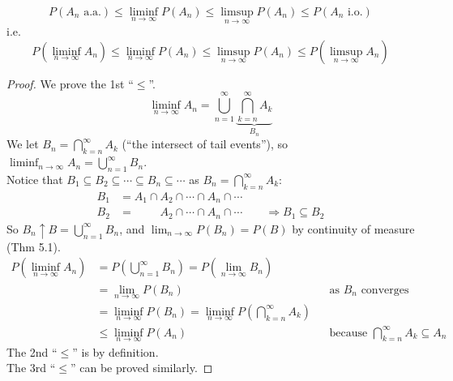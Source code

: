 \begin{reqproof}
\begin{proposition}[][5.2.2]
    \[P(A_n \text{ a.a.}) \leq \liminf_{n\to\infty} P(A_n) \leq \limsup_{n\to\infty} P(A_n) \leq P(A_n \text{ i.o.})\]
    i.e.
    \[P\left(\liminf_{n\to\infty} A_n\right) \leq \liminf_{n\to\infty} P(A_n) \leq \limsup_{n\to\infty} P(A_n) \leq P\left(\limsup_{n\to\infty} A_n\right)\]
    \begin{proof}
        We prove the 1st ``$\leq$''.
        \[\liminf_{n\to\infty} A_n = \bigcup_{n=1}^\infty \underbrace{\bigcap_{k=n}^\infty A_k}_{B_n}\]
        We let $B_n = \bigcap_{k=n}^\infty A_k$ (``the intersect of tail events''), so $\liminf_{n\to\infty} A_n = \bigcup_{n=1}^\infty B_n$.
        \\Notice that $B_1 \subseteq B_2 \subseteq \cdots \subseteq B_n \subseteq \cdots$ as $B_n = \bigcap_{k=n}^\infty A_k$:
        \begin{align*}
            B_1 &= A_1 \cap A_2 \cap \cdots \cap A_n \cap \cdots\\
            B_2 &= \phantom{A_1 \cap{}} A_2 \cap \cdots \cap A_n \cap \cdots \qquad \Rightarrow B_1 \subseteq B_2
        \end{align*}
        So $B_n \uparrow B = \bigcup_{n=1}^\infty B_n$, and $\lim_{n\to\infty} P(B_n) = P(B)$ by continuity of measure (Thm 5.1).
        \begin{align*}
            P\left(\liminf_{n\to\infty} A_n\right) &= P\left(\bigcup_{n=1}^\infty B_n\right) = P\left(\lim_{n\to\infty} B_n\right)\\
            &= \lim_{n\to\infty} P(B_n) & &\text{as $B_n$ converges}\\
            &= \liminf_{n\to\infty} P(B_n) = \liminf_{n\to\infty} P\left(\bigcap_{k=n}^\infty A_k\right)\\
            &\leq \liminf_{n\to\infty} P(A_n) & &\text{because } \textstyle\bigcap_{k=n}^\infty A_k \subseteq A_n
        \end{align*}
        The 2nd ``$\leq$'' is by definition.
        \\The 3rd ``$\leq$'' can be proved similarly.
    \end{proof}
\end{proposition}
\end{reqproof}

